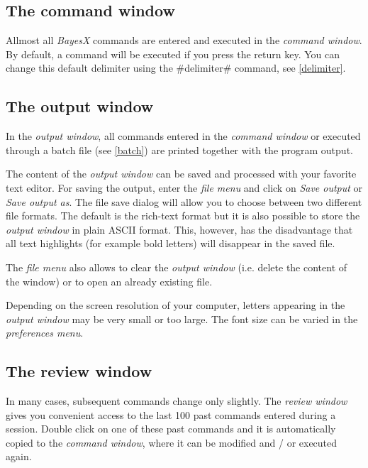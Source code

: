 \subsection{The command window}
 

Allmost all {\em BayesX} commands are entered and executed in the {\em command window}. By default, a command will be executed
if you press the return key. You can change this default delimiter using the #delimiter# command, see \autoref{delimiter}.

\subsection{The output window}
 

In the {\em output window}, all commands entered in the {\em command window} or executed through a batch file (see
\autoref{batch}) are printed together with the program output.

 The content of the {\em output window} can be saved and processed with your favorite text editor. For
saving the output, enter the {\em file menu} and click on {\em Save output} or {\em Save output as}. The file save dialog will
allow you to choose between two different file formats. The default is the rich-text format but it is also possible to store
the {\em output window} in plain ASCII format. This, however, has the disadvantage that all text highlights (for example bold
letters) will disappear in the saved file.

The {\em file menu} also allows to clear the {\em output window} (i.e. delete the content of the window) or to open an already
existing file.

Depending on the screen resolution of your computer, letters appearing in the {\em output window} may be very small or too
large. The font size can be varied in the {\em preferences menu}.

\subsection{The review window}
 

In many cases, subsequent commands change only slightly. The {\em review window} gives you convenient access to the last 100
past commands entered during a session. Double click on one of these past commands and it is automatically copied to the {\em
command window}, where it can be modified and / or executed again.

